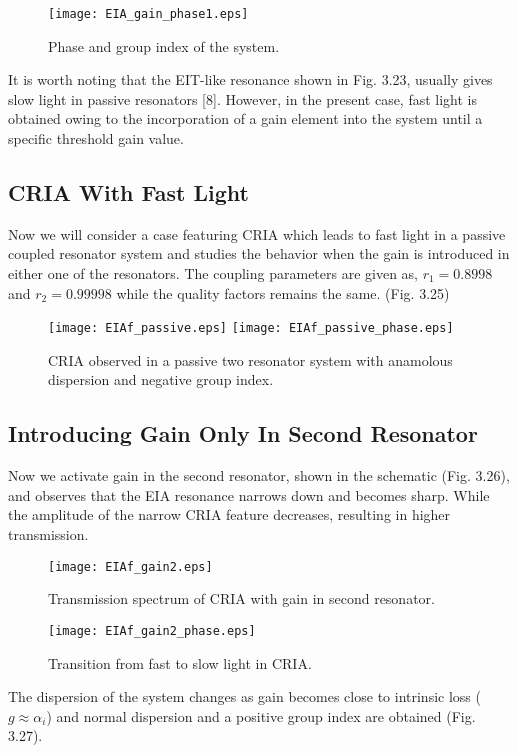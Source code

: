 \begin{figure}[h]
\centering
\texttt{[image: EIA\_gain\_phase1.eps]}
\caption{Phase and group index of the system.}
\end{figure}

It is worth noting that the EIT-like resonance shown in Fig. 3.23, usually gives slow light in passive resonators [8]. However, in the present case, fast light is obtained owing to the incorporation of a gain element into the system until a specific threshold gain value.

\subsection{CRIA With Fast Light}
Now we will consider a case featuring CRIA which leads to fast light in a passive coupled resonator system and studies the behavior when the gain is introduced in either one of the resonators. The coupling parameters are given as, $r_{1} = 0.8998$ and $r_{2} = 0.99998$ while the quality factors remains the same. (Fig. 3.25)

\begin{figure}[h]
\centering
\texttt{[image: EIAf\_passive.eps]}
\texttt{[image: EIAf\_passive\_phase.eps]}
\caption{CRIA observed in a passive two resonator system with anamolous dispersion and negative group index.}
\end{figure}

\subsection{Introducing Gain Only In Second Resonator}
Now we activate gain in the second resonator, shown in the schematic (Fig. 3.26), and observes that the EIA resonance narrows down and becomes sharp. While the amplitude of the narrow CRIA feature decreases, resulting in higher transmission. 

\begin{figure}[h]
\centering 
\texttt{[image: EIAf\_gain2.eps]}
\caption{Transmission spectrum of CRIA with gain in second resonator.}
\end{figure}


\begin{figure}[h]
\centering
\texttt{[image: EIAf\_gain2\_phase.eps]}
\caption{Transition from fast to slow light in CRIA.}
\end{figure}

The dispersion of the system changes as gain becomes close to intrinsic loss ($g \approx \alpha_{i}$) and normal dispersion and a positive group index are obtained (Fig. 3.27).

